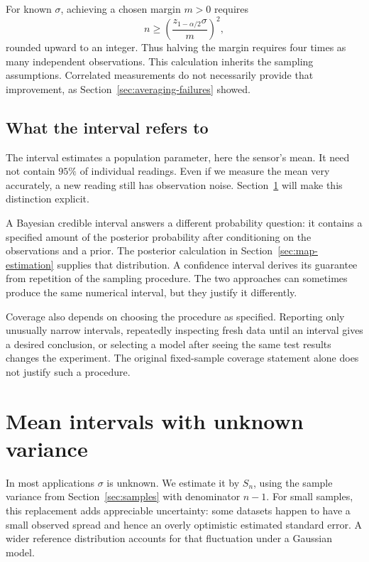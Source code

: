 For known \(\sigma\), achieving a chosen margin \(m>0\) requires
\[
  n\ge\left(\frac{z_{1-\alpha/2}\sigma}{m}\right)^2,
\]
rounded upward to an integer. Thus halving the margin requires four
times as many independent observations. This calculation inherits the
sampling assumptions. Correlated measurements do not necessarily
provide that improvement, as Section~\ref{sec:averaging-failures} showed.

\subsection{What the interval refers to}

The interval estimates a population parameter, here the sensor's mean.
It need not contain \(95\%\) of individual readings. Even if we measure
the mean very accurately, a new reading still has observation noise.
Section~\ref{sec:mean-intervals} will make this distinction explicit.

A Bayesian credible interval answers a different probability question:
it contains a specified amount of the posterior probability after
conditioning on the observations and a prior. The posterior calculation
in Section~\ref{sec:map-estimation} supplies that distribution. A
confidence interval derives its guarantee from repetition of the
sampling procedure. The two approaches can sometimes produce the same
numerical interval, but they justify it differently.

Coverage also depends on choosing the procedure as specified. Reporting
only unusually narrow intervals, repeatedly inspecting fresh data until
an interval gives a desired conclusion, or selecting a model after
seeing the same test results changes the experiment. The original
fixed-sample coverage statement alone does not justify such a procedure.

\section{Mean intervals with unknown variance}
\label{sec:mean-intervals}

In most applications \(\sigma\) is unknown. We estimate it by \(S_n\),
using the sample variance from Section~\ref{sec:samples} with denominator
\(n-1\). For small samples, this replacement adds appreciable uncertainty:
some datasets happen to have a small observed spread and hence an
overly optimistic estimated standard error. A wider reference
distribution accounts for that fluctuation under a Gaussian model.

